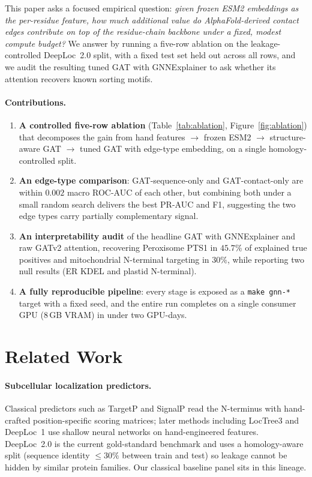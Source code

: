 \documentclass{article}
\begin{document}
This paper asks a focused empirical question: \emph{given frozen
ESM2 embeddings as the per-residue feature, how much additional value
do AlphaFold-derived contact edges contribute on top of the
residue-chain backbone under a fixed, modest compute budget?} We answer by
running a five-row ablation on the leakage-controlled DeepLoc~2.0
split, with a fixed test set held out across all rows, and we
audit the resulting tuned GAT with GNNExplainer to ask whether its
attention recovers known sorting motifs.

\paragraph{Contributions.}
\begin{enumerate}
\item \textbf{A controlled five-row ablation} (Table~\ref{tab:ablation},
Figure~\ref{fig:ablation}) that decomposes the gain from hand features
$\to$ frozen ESM2 $\to$ structure-aware GAT $\to$ tuned GAT with
edge-type embedding, on a single homology-controlled split.
\item \textbf{An edge-type comparison}: GAT-sequence-only and
GAT-contact-only are within $0.002$ macro ROC-AUC of each other, but
combining both under a small random search delivers the best PR-AUC and
F1, suggesting the two edge types carry partially complementary signal.
\item \textbf{An interpretability audit} of the headline GAT with
GNNExplainer and raw GATv2 attention, recovering Peroxisome PTS1 in
$45.7\%$ of explained true positives and mitochondrial N-terminal
targeting in $30\%$, while reporting two null results (ER KDEL and
plastid N-terminal).
\item \textbf{A fully reproducible pipeline}: every stage is exposed
as a \texttt{make gnn-*} target with a fixed seed, and the entire run
completes on a single consumer GPU (8\,GB VRAM) in under two GPU-days.
\end{enumerate}

\section{Related Work}\label{sec:related}

\paragraph{Subcellular localization predictors.}
Classical predictors such as TargetP and SignalP read the N-terminus
with hand-crafted position-specific scoring matrices; later methods
including LocTree3 and DeepLoc~1 use shallow neural networks on
hand-engineered features. DeepLoc~2.0 is the current gold-standard
benchmark and uses a homology-aware split (sequence identity $\le 30\%$
between train and test) so leakage cannot be hidden by similar protein
families. Our classical baseline panel sits in this lineage.
\end{document}
